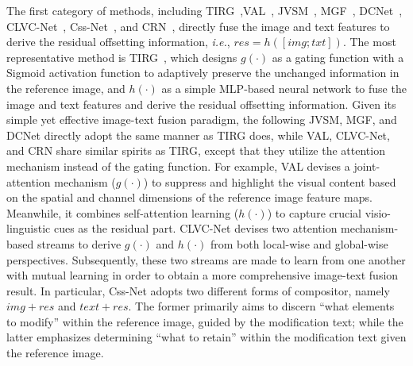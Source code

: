 The first category of methods, including TIRG~\cite{vo2019tirg},VAL~\cite{chen2020val}, JVSM~\cite{chen2020jvsm}, MGF~\cite{liu2021mgf}, DCNet~\cite{kim2021dcnet}, CLVC-Net~\cite{wen2021clvcnet}, Css-Net~\cite{zhang2024cssnet}, and CRN~\cite{yang2023crn}, directly fuse the image and text features to derive the residual offsetting information, \textit{i.e.}, \underline{$\mathit{res} = h\left( \left[\mathit{img};\mathit{txt}\right] \right)$}. The most representative method is TIRG~\cite{vo2019tirg}, which designs $g\left(\cdot\right)$ as a gating function with a Sigmoid activation function to adaptively preserve the unchanged information in the reference image, and $h\left(\cdot\right)$ as a simple MLP-based neural network to fuse the image and text features and derive the residual offsetting information. Given its simple yet effective image-text fusion paradigm, the following JVSM, MGF, and DCNet directly adopt the same manner as TIRG does, while VAL, CLVC-Net, and CRN share similar spirits as TIRG, except that they utilize the attention mechanism instead of the gating function. For example, VAL devises a joint-attention mechanism ($g\left(\cdot\right)$) to suppress and highlight the visual content based on the spatial and channel dimensions of the reference image feature maps. Meanwhile, it combines self-attention learning ($h\left(\cdot\right)$) to capture crucial visio-linguistic cues as the residual part. CLVC-Net devises two attention mechanism-based streams to derive $g\left(\cdot\right)$ and $h\left(\cdot\right)$ from both local-wise and global-wise perspectives. Subsequently, these two streams are made to learn from one another with mutual learning in order to obtain a more comprehensive image-text fusion result. In particular, Css-Net adopts two different forms of compositor, namely \underline{$\mathit{img} + \mathit{res}$} and \underline{$\mathit{text} + \mathit{res}$}. The former primarily aims to discern ``what elements to modify'' within the reference image, guided by the modification text; while the latter emphasizes determining ``what to retain'' within the modification text given the reference image. 

